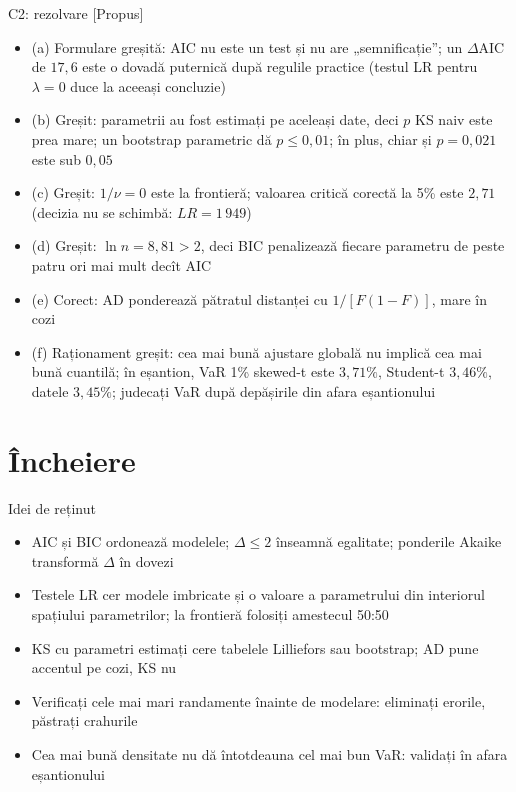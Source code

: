 \ifsolutions
\begin{frame}{C2: rezolvare [Propus]}
\itemsize{\footnotesize}
\begin{itemize}
    \item (a) Formulare greșită: AIC nu este un test și nu are „semnificație”; un $\Delta$AIC de $17{,}6$ este o dovadă puternică după regulile practice (testul LR pentru $\lambda = 0$ duce la aceeași concluzie)
    \item (b) Greșit: parametrii au fost estimați pe aceleași date, deci $p$ KS naiv este prea mare; un bootstrap parametric dă $p \le 0{,}01$; în plus, chiar și $p = 0{,}021$ este sub $0{,}05$
    \item (c) Greșit: $1/\nu = 0$ este la frontieră; valoarea critică corectă la 5\% este $2{,}71$ (decizia nu se schimbă: $LR = 1\,949$)
    \item (d) Greșit: $\ln n = 8{,}81 > 2$, deci BIC penalizează fiecare parametru de peste patru ori mai mult decît AIC
    \item (e) Corect: AD ponderează pătratul distanței cu $1/[F(1 - F)]$, mare în cozi
    \item (f) Raționament greșit: cea mai bună ajustare globală nu implică cea mai bună cuantilă; în eșantion, VaR 1\% skewed-t este $3{,}71\%$, Student-t $3{,}46\%$, datele $3{,}45\%$; judecați VaR după depășirile din afara eșantionului
\end{itemize}
\end{frame}
\fi


\section{Încheiere}

\begin{frame}{Idei de reținut}
\itemsize{\small}
\begin{itemize}
    \item AIC și BIC ordonează modelele; $\Delta \le 2$ înseamnă egalitate; ponderile Akaike transformă $\Delta$ în dovezi
    \item Testele LR cer modele imbricate și o valoare a parametrului din interiorul spațiului parametrilor; la frontieră folosiți amestecul 50:50
    \item KS cu parametri estimați cere tabelele Lilliefors sau bootstrap; AD pune accentul pe cozi, KS nu
    \item Verificați cele mai mari randamente înainte de modelare: eliminați erorile, păstrați crahurile
    \item Cea mai bună densitate nu dă întotdeauna cel mai bun VaR: validați în afara eșantionului
\end{itemize}
\end{frame}

